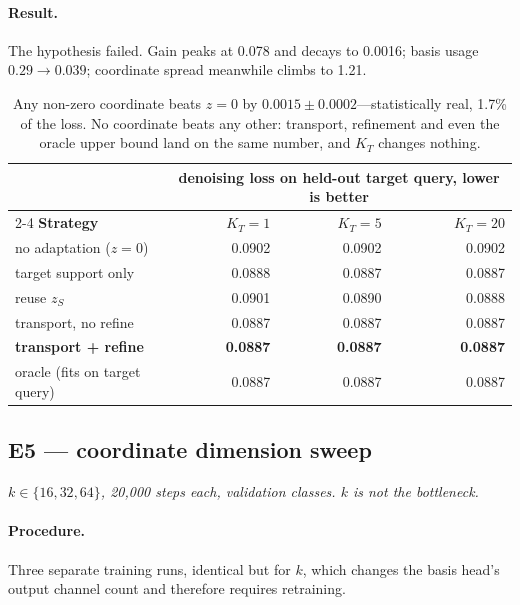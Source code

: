 \documentclass[11pt]{article}
\newcommand{\zS}{z_{S}}
\newcommand{\KT}{K_{T}}
\begin{document}
\paragraph{Result.} The hypothesis failed. Gain peaks at 0.078 and decays to 0.0016; basis usage
$0.29\to0.039$; coordinate spread meanwhile climbs to 1.21.

\begin{table}[htbp]
\centering\small
\begin{tabular}{@{}lrrr@{}}
\toprule
& \multicolumn{3}{c}{denoising loss on held-out target query, lower is better} \\
\cmidrule(lr){2-4}
\textbf{Strategy} & $\KT=1$ & $\KT=5$ & $\KT=20$ \\
\midrule
no adaptation ($z=0$)  & 0.0902 & 0.0902 & 0.0902 \\
target support only    & 0.0888 & 0.0887 & 0.0887 \\
reuse $\zS$            & 0.0901 & 0.0890 & 0.0888 \\
transport, no refine   & 0.0887 & 0.0887 & 0.0887 \\
\textbf{transport + refine} & \textbf{0.0887} & \textbf{0.0887} & \textbf{0.0887} \\
oracle (fits on target query) & 0.0887 & 0.0887 & 0.0887 \\
\bottomrule
\end{tabular}
\caption{Any non-zero coordinate beats $z=0$ by $0.0015\pm0.0002$---statistically real, 1.7\% of
the loss. No coordinate beats any other: transport, refinement and even the oracle upper bound land
on the same number, and $\KT$ changes nothing.}
\end{table}

\subsection{E5 --- coordinate dimension sweep}

\textit{$k\in\{16,32,64\}$, 20{,}000 steps each, validation classes. $k$ is not the bottleneck.}

\paragraph{Procedure.} Three separate training runs, identical but for $k$, which changes the basis
head's output channel count and therefore requires retraining.
\end{document}
